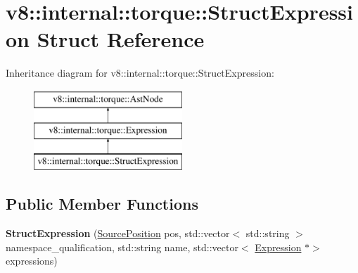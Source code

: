 \hypertarget{structv8_1_1internal_1_1torque_1_1StructExpression}{}\section{v8\+:\+:internal\+:\+:torque\+:\+:Struct\+Expression Struct Reference}
\label{structv8_1_1internal_1_1torque_1_1StructExpression}
Inheritance diagram for v8\+:\+:internal\+:\+:torque\+:\+:Struct\+Expression\+:\begin{figure}[H]
\begin{center}
\leavevmode
\includegraphics[height=3.000000cm]{structv8_1_1internal_1_1torque_1_1StructExpression}
\end{center}
\end{figure}
\subsection*{Public Member Functions}
\begin{DoxyCompactItemize}
\item 
\mbox{\label{structv8_1_1internal_1_1torque_1_1StructExpression_a07a6b08348a6930cda55a318aaf51e1c}} 
{\bfseries Struct\+Expression} (\mbox{\hyperlink{structv8_1_1internal_1_1torque_1_1SourcePosition}{Source\+Position}} pos, std\+::vector$<$ std\+::string $>$ namespace\+\_\+qualification, std\+::string name, std\+::vector$<$ \mbox{\hyperlink{structv8_1_1internal_1_1torque_1_1Expression}{Expression}} $\ast$$>$ expressions)
\end{DoxyCompactItemize}
